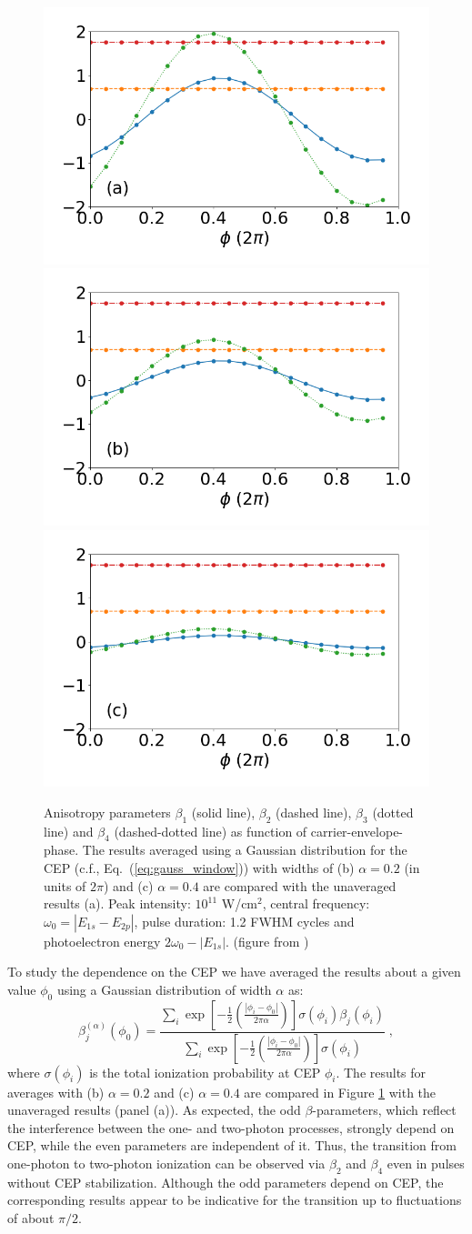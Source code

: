 \begin{figure}[!ht]
\centering
\includegraphics[width=0.32\linewidth]{figs/Photo_ionization/short_pulse/Beta_vs_cep.png}
\includegraphics[width=0.32\linewidth]{figs/Photo_ionization/short_pulse/Beta_vs_cep_0p20.png}
\includegraphics[width=0.32\linewidth]{figs/Photo_ionization/short_pulse/Beta_vs_cep_0p40.png}
\caption{
Anisotropy parameters $\beta_1$ (solid line), $\beta_2$ (dashed line), $\beta_3$ (dotted line) and $\beta_4$ (dashed-dotted line) as function of carrier-envelope-phase. The results averaged using a Gaussian distribution for the CEP (c.f., Eq.\ (\ref{eq:gauss_window})) with widths of (b) $\alpha = 0.2$ (in units of $2\pi$) and (c) $\alpha = 0.4$ are compared with the unaveraged results (a). Peak intensity: $10^{11}$ W/cm$^2$, central frequency:  $\omega_0 = |E_{1s}-E_{2p}|$, pulse duration: 1.2 FWHM cycles and photoelectron energy $2\omega_0 - |E_{1s}|$. (figure from \cite{venzke2020_ionization})
} 
  \label{fig:beta_cep}
\end{figure}

To study the dependence on the CEP we have averaged the results about a given value $\phi_0$ using a Gaussian distribution of width $\alpha$ as: 
%
\begin{equation}
\beta_j^{(\alpha)}(\phi_0) 
= 
\frac{\sum_i \exp\left[-\frac{1}{2}\left(\frac{|\phi_i-\phi_0|}{2\pi\alpha}\right)\right] \sigma(\phi_i) \beta_j(\phi_i)}
{\sum_i\exp\left[-\frac{1}{2}\left(\frac{|\phi_i-\phi_0|}{2\pi\alpha}\right)\right] \sigma(\phi_i)}\; ,
    \label{eq:gauss_window}
\end{equation}
%
where $\sigma(\phi_i)$ is the total ionization probability at CEP $\phi_i$. The results for averages with (b) $\alpha = 0.2$ and (c) $\alpha = 0.4$ are compared in Figure \ref{fig:beta_cep} with the unaveraged results (panel (a)). As expected, the odd $\beta$-parameters, which reflect the interference between the one- and two-photon processes, strongly depend on CEP, while the even parameters are independent of it. Thus, the transition from one-photon to two-photon ionization can be observed via $\beta_2$ and $\beta_4$ even in pulses without CEP stabilization. Although the odd parameters depend on CEP, the corresponding results appear to be indicative for the transition up to fluctuations of about $\pi/2$.

